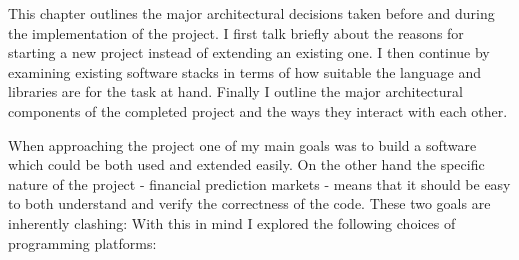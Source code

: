 \documentclass[bsc,frontabs,twoside,singlespacing,parskip,deptreport]{infthesis}     %
\begin{document}
	This chapter outlines the major architectural decisions taken before and during the implementation of the project. I first talk briefly about the reasons for starting a new project instead of extending an existing one. I then continue by examining existing software stacks in terms of how suitable the language and libraries are for the task at hand. Finally I outline the major architectural components of the completed project and the ways they interact with each other. 

	When approaching the project one of my main goals was to build a software which could be both used and extended easily. On the other hand the specific nature of the project - financial prediction markets - means that it should be easy to both understand and verify the correctness of the code. These two goals are inherently clashing: 
With this in mind I explored the following choices of programming platforms:
\end{document}
